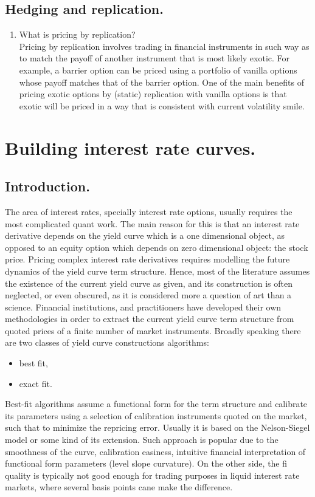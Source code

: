 \documentclass{book}
\begin{document}
\section{Hedging and replication.}
\begin{enumerate}
\item What is pricing by replication?\\
Pricing by replication involves trading in financial instruments in such way as to match the payoff of another instrument that is most likely exotic. For example, a barrier option can be priced using a portfolio of vanilla options whose payoff matches that of the barrier option. One of the main benefits of pricing exotic options by (static) replication with vanilla options is that exotic will be priced in a way that is consistent with current volatility smile.
\end{enumerate}

\chapter{Building interest rate curves.}
\section{Introduction.}
The area of interest rates, specially interest rate options, usually requires the most complicated quant work. The main reason for this is that an interest rate derivative depends on the yield curve which is a one dimensional object, as opposed to an equity option which depends on zero dimensional object: the stock price.
Pricing complex interest rate derivatives requires modelling the future dynamics of the yield curve term structure. Hence, most of the literature assumes the existence of the current yield curve as given, and its construction is often neglected, or even obscured, as it is considered more a question of art than a science.
Financial institutions, and practitioners have developed their own methodologies in order to extract the current yield curve term structure from quoted prices of a finite number of market instruments. Broadly speaking there are two classes of yield curve constructions algorithms:
\begin{itemize}
\item best fit,
\item exact fit.
\end{itemize}
Best-fit algorithms assume a functional form for the term structure and calibrate its parameters using a selection of calibration instruments quoted on the market, such that to minimize the repricing error. Usually it is based on the Nelson-Siegel model or some kind of its extension. Such approach is popular due to the smoothness of the curve, calibration easiness, intuitive financial interpretation of functional form parameters (level slope curvature). On the other side, the fi quality is typically not good enough for trading purposes in liquid interest rate markets, where several basis points cane make the difference.
\end{document}
